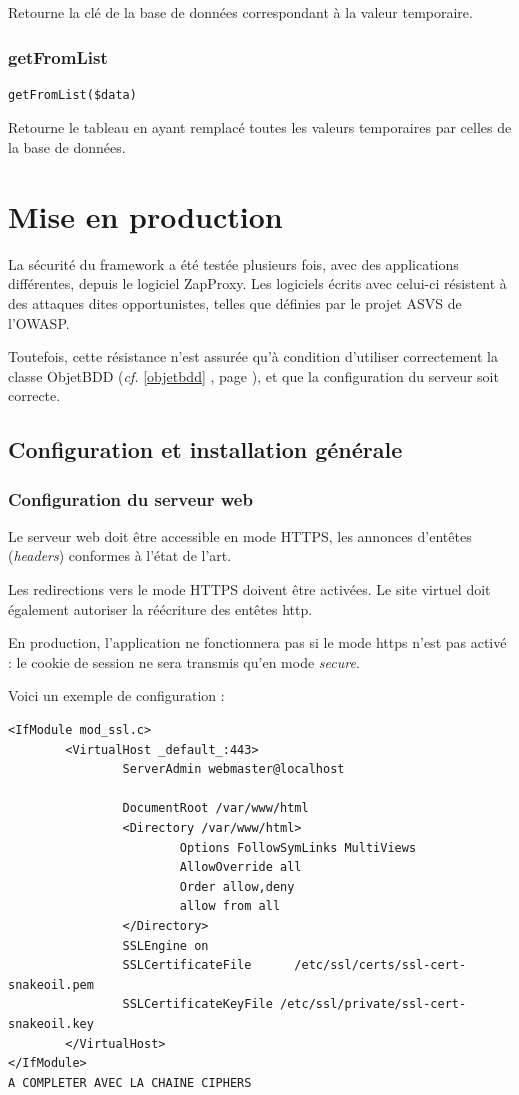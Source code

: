 Retourne la clé de la base de données correspondant à la valeur temporaire.

\subsection{getFromList}
\begin{lstlisting}
getFromList($data)
\end{lstlisting}
Retourne le tableau en ayant remplacé toutes les valeurs temporaires par celles de la base de données.



\chapter{Mise en production}

La sécurité du framework a été testée plusieurs fois, avec des applications différentes, depuis le logiciel ZapProxy. Les logiciels écrits avec celui-ci résistent à des attaques dites opportunistes, telles que définies par le projet ASVS de l'OWASP.

Toutefois, cette résistance n'est assurée qu'à condition d'utiliser correctement la classe ObjetBDD (\textit{cf.} \ref{objetbdd} \textit{}, page \pageref{objetbdd}), et que la configuration du serveur soit correcte.

\section{Configuration et installation générale}

\subsection{Configuration du serveur web}

Le serveur web doit être accessible en mode HTTPS, les annonces d'entêtes (\textit{headers}) conformes à l'état de l'art.

Les redirections vers le mode HTTPS doivent être activées. Le site virtuel doit également autoriser la réécriture des entêtes http.

En production, l'application ne fonctionnera pas si le mode https n'est pas activé : le cookie de session ne sera transmis qu'en mode \textit{secure}.

Voici un exemple de configuration :

\begin{lstlisting}
<IfModule mod_ssl.c>
        <VirtualHost _default_:443>
                ServerAdmin webmaster@localhost

                DocumentRoot /var/www/html
                <Directory /var/www/html>
                        Options FollowSymLinks MultiViews
                        AllowOverride all
                        Order allow,deny
                        allow from all
                </Directory>
                SSLEngine on
                SSLCertificateFile      /etc/ssl/certs/ssl-cert-snakeoil.pem
                SSLCertificateKeyFile /etc/ssl/private/ssl-cert-snakeoil.key
        </VirtualHost>
</IfModule>
A COMPLETER AVEC LA CHAINE CIPHERS
\end{lstlisting}

